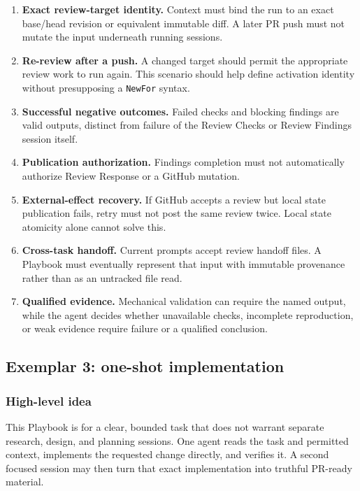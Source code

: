 \documentclass[11pt]{article}
\newcommand{\artifact}[1]{\texttt{#1}}
\begin{document}
\begin{enumerate}
  \item \textbf{Exact review-target identity.} Context must bind the run to an exact base/head revision or equivalent immutable diff. A later PR push must not mutate the input underneath running sessions.
  \item \textbf{Re-review after a push.} A changed target should permit the appropriate review work to run again. This scenario should help define activation identity without presupposing a \artifact{NewFor} syntax.
  \item \textbf{Successful negative outcomes.} Failed checks and blocking findings are valid outputs, distinct from failure of the Review Checks or Review Findings session itself.
  \item \textbf{Publication authorization.} Findings completion must not automatically authorize Review Response or a GitHub mutation.
  \item \textbf{External-effect recovery.} If GitHub accepts a review but local state publication fails, retry must not post the same review twice. Local state atomicity alone cannot solve this.
  \item \textbf{Cross-task handoff.} Current prompts accept review handoff files. A Playbook must eventually represent that input with immutable provenance rather than as an untracked file read.
  \item \textbf{Qualified evidence.} Mechanical validation can require the named output, while the agent decides whether unavailable checks, incomplete reproduction, or weak evidence require failure or a qualified conclusion.
\end{enumerate}

\subsection{Exemplar 3: one-shot implementation}

\subsubsection{High-level idea}

This Playbook is for a clear, bounded task that does not warrant separate research, design, and planning sessions. One agent reads the task and permitted context, implements the requested change directly, and verifies it. A second focused session may then turn that exact implementation into truthful PR-ready material.
\end{document}
